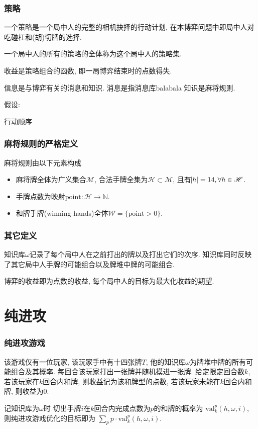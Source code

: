 \documentclass{ctexbeamer}
\newcommand{\mahjong}{\mathscr{M}}
\newcommand{\point}{\mathrm{point}}
\newcommand{\Hand}{\mathscr{H}}
\newcommand{\hand}{h}
\newcommand{\base}{\omega}
\begin{document}
	\begin{frame}
		\frametitle{策略}
		\begin{definition}[策略]
			一个策略是一个局中人的完整的相机抉择的行动计划,
			在本博弈问题中即局中人对吃碰杠和(胡)切牌的选择.
		\end{definition}
		\begin{definition}[策略集]
			一个局中人的所有的策略的全体称为这个局中人的策略集.
		\end{definition}
	\end{frame}

	收益是策略组合的函数, 即一局博弈结束时的点数得失.

	信息是与博弈有关的消息和知识. 消息是指消息库balabala 知识是麻将规则.

	假设: 
	
	行动顺序

	\begin{frame}
		\frametitle{麻将规则的严格定义}
		\begin{definition}[麻将规则]
			麻将规则由以下元素构成
			\begin{itemize}
				\item 麻将牌全体为广义集合$\mahjong$,
					合法手牌全集为$\Hand\subset\mahjong$,
					且有$\abs{\hand}=14, \forall{\hand\in\Hand}$.
				\item 手牌点数为映射$\point: \Hand\rightarrow\mathbb{N}$.
				\item 和牌手牌(winning hands)全体$\mathscr{W}=\{\point>0\}$.
			\end{itemize}
		\end{definition}
	\end{frame}
	
	\begin{frame}
		\frametitle{其它定义}
		\begin{definition}[知识库]%
			知识库$\base$记录了每个局中人在之前打出的牌以及打出它们的次序.
			知识库同时反映了其它局中人手牌的可能组合以及牌堆中牌的可能组合.
		\end{definition}
		\begin{definition}[收益]
			博弈的收益即为点数的收益, 每个局中人的目标为最大化收益的期望.
		\end{definition}
	\end{frame}

	\section{纯进攻}

	\begin{frame}
		\frametitle{纯进攻游戏}
		\begin{definition}[纯进攻游戏]
			该游戏仅有一位玩家, 该玩家手中有十四张牌$T$,
			他的知识库$\base$为牌堆中牌的所有可能组合及其概率.
			每回合该玩家打出一张牌并随机摸进一张牌. 给定限定回合数$k$,
			若该玩家在$k$回合内和牌, 则收益记为该和牌型的点数,
			若该玩家未能在$k$回合内和牌, 则收益为0.
		\end{definition}
		记知识库为$\base$时
		切出手牌$i$在$k$回合内完成点数为$p$的和牌的概率为
		$\mathrm{val}_{k}^{p}(\hand, \base, i)$,
		则纯进攻游戏优化的目标即为
		$\sum_{p}{p\cdot\mathrm{val}_{k}^{p}(\hand, \base, i)}$.
	\end{frame}
\end{document}
